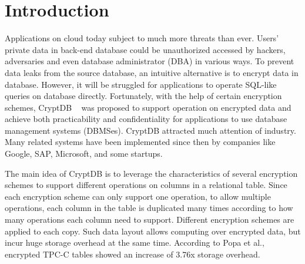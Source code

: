 \section{Introduction}

Applications on cloud today subject to much more threats than ever. Users' private data in back-end database could be unauthorized accessed by hackers, adversaries and even database administrator (DBA) in various ways. To prevent data leaks from the source database, an intuitive alternative is to encrypt data in database. However, it will be struggled for applications to operate SQL-like queries on database directly. Fortunately, with the help of certain encryption schemes, CryptDB ~\citep{popa2011cryptdb} was proposed to support operation on encrypted data and achieve both practicability and confidentiality for applications to use database management systems (DBMSes). CryptDB attracted much attention of industry. Many related systems have been implemented since then by companies like Google, SAP, Microsoft, and some startups\citep{cryptdbsite, kerschbaum2013encrypted}.


The main idea of CryptDB is to leverage the characteristics of several encryption schemes to support different operations on columns in a relational table.  Since each encryption scheme can only support one operation, to allow multiple operations, each column in the table is duplicated many times according to how many operations each column need to support. Different encryption schemes are applied to each copy. Such data layout allows computing over encrypted data, but incur huge storage overhead at the same time. According to Popa et al.\citep{popa2011cryptdb}, encrypted TPC-C tables showed an increase of 3.76x storage overhead.

